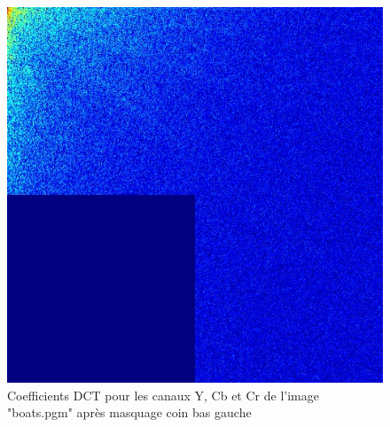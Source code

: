 \documentclass[12pt]{report}
\begin{document}
\begin{figure}[H]
\begin{center}
\includegraphics[scale=0.25]{../ImageRes/dct_masked3_2.jpg} 
\caption{Coefficients DCT pour les canaux Y, Cb et Cr de l'image "boats.pgm" après masquage coin bas gauche}
\end{center}
\end{figure}
\end{document}
